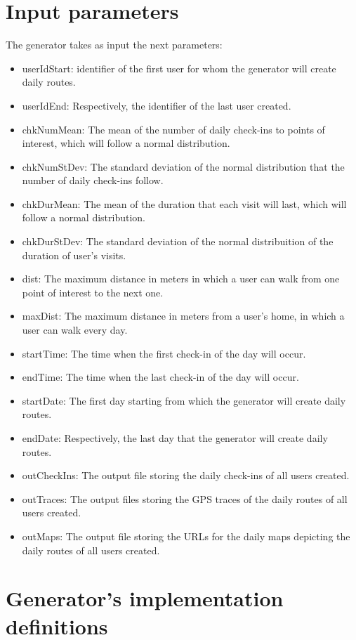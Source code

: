 \section{Input parameters}

The generator takes as input the next parameters: 

\begin{itemize}
 \item userIdStart: identifier of the first user for whom the generator will create daily routes.
 \item userIdEnd: Respectively, the identifier of the last user created.
 \item chkNumMean: The mean of the number of daily check-ins to points of interest, which will follow a normal distribution.
 \item chkNumStDev: The standard deviation of the normal distribution that the number of daily check-ins follow.
 \item chkDurMean: The mean of the duration that each visit will last, which will follow a normal distribution.
 \item chkDurStDev: The standard deviation of the normal distribuition of the duration of user's visits.
 \item dist: The maximum distance in meters in which a user can walk from one point of interest to the next one.
 \item maxDist: The maximum distance in meters from a user's home, in which a user can walk every day.
 \item startTime: The time when the first check-in of the day will occur.
 \item endTime: The time when the last check-in of the day will occur.
 \item startDate: The first day starting from which the generator will create daily routes.
 \item endDate: Respectively, the last day that the generator will create daily routes.
 \item outCheckIns: The output file storing the daily check-ins of all users created.
 \item outTraces: The output files storing the GPS traces of the daily routes of all users created.
 \item outMaps: The output file storing the URLs for the daily maps depicting the daily routes of all users created.
\end{itemize}

\section{Generator's implementation definitions}

